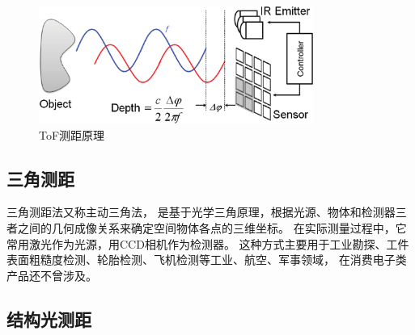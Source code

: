 \begin{figure}[h]
    \centering
    \includegraphics[width = 0.8\textwidth]{./Pictures/TOF.eps}
    \caption{ToF测距原理}
    \label{tof}
\end{figure}

\subsection{三角测距}

三角测距法又称主动三角法，
是基于光学三角原理，根据光源、物体和检测器三者之间的几何成像关系来确定空间物体各点的三维坐标。
在实际测量过程中，它常用激光作为光源，用CCD相机作为检测器。
这种方式主要用于工业勘探、工件表面粗糙度检测、轮胎检测、飞机检测等工业、航空、军事领域，
在消费电子类产品还不曾涉及。

\subsection{结构光测距}




